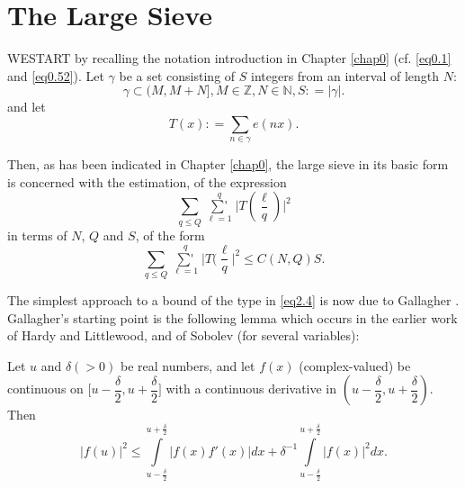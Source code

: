 
\chapter{The Large Sieve}\label{chap2}

WE\pageoriginale START by recalling the notation introduction in
Chapter \ref{chap0} (cf. \eqref{eq0.1} and \eqref{eq0.52}). Let
$\gamma$ be a set 
consisting of $S$ integers from an interval of length $N$:  
\begin{equation*}
\gamma \subset (M,M+N], M \in \mathbb{Z}, N \in \mathbb{N}, S: =
  |\gamma |. \tag{2.1}\label{eq2.1} 
\end{equation*}
and let
\begin{equation*}
T(x): = \sum_{n \in \gamma} e(nx). \tag{2.2}\label{eq2.2}
\end{equation*}

Then, as has been indicated in Chapter \ref{chap0}, the large sieve in
its basic form is concerned with the estimation, of the expression  
\begin{equation*}
\sum_{q \leq Q} \mathop{\sum{}'}\limits_{\ell =1}^q \bigg|T( \frac{\ell}{q})
\bigg |^2 
\tag{2.3}\label{eq2.3} 
\end{equation*}
in terms of $N$, $Q$ and $S$, of the form
\begin{equation*}
\sum_{q \leq Q} \mathop{\sum{}'}\limits_{\ell =1}^q \bigg |T (
\frac{\ell}{q} \bigg|^2 \leq C(N,Q)S. \tag{2.4}\label{eq2.4}   
\end{equation*}

The simplest approach to a bound of the type in \eqref{eq2.4} is now due to
Gallagher \cite{key1}. Gallagher's starting point is the following lemma
which occurs in the earlier work of Hardy and Littlewood, and of
Sobolev (for several variables): 

\setcounter{section}{2}
\setcounter{lemma}{0}
\begin{lemma}\label{chap2-lem2.1} %
Let $u$ and $\delta( > 0)$ be real numbers, and let $f(x)$
(complex-valued) be continuous on $\bigg[u - \dfrac{\delta}{2}, u+ 
  \dfrac{\delta}{2} \bigg]$ with a continuous derivative in $( u -
\dfrac{\delta}{2}, u + \dfrac{\delta}{2})$. Then  
\begin{equation*}
|f(u)|^2 \leq \int\limits_{u- \frac{\delta}{2}}^{u+
  \frac{\delta}{2}}|f(x) f'(x)| dx + \delta^{-1} \int\limits_{u-
  \frac{\delta}{2}}^{u+ \frac{\delta}{2}} |f(x)|^2 dx. \tag{2.5}\label{eq2.5} 
\end{equation*}
\end{lemma}

